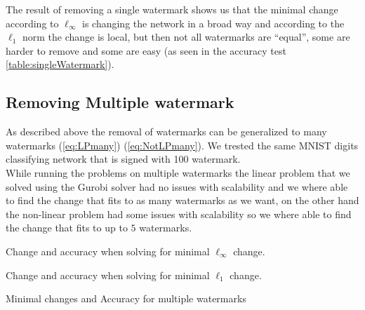 \documentclass[a4paper]{easychair}
\begin{document}
The result of removing a single watermark shows us that the minimal change according to $\ell_\infty$ is changing the network in a broad way and according to the $\ell_1$ norm the change is local, but then not all watermarks are ``equal'', some are harder to remove and some are easy (as seen in the accuracy test \ref{table:singleWatermark}).

\subsection{Removing Multiple watermark}

As described above the removal of watermarks can be generalized to many watermarks (\ref{eq:LPmany}) (\ref{eq:NotLPmany}). We trested the same MNIST digits classifying network that is signed with 100 watermark.
\\
While running the problems on multiple watermarks the linear problem that we solved using the Gurobi solver had no issues with scalability and we where able to find the change that fits to as many watermarks as we want, on the other hand the non-linear problem had some issues with scalability so we where able to find the change that fits to up to $5$ watermarks.

\begin{table}
\begin{subtable}{1\textwidth}
\centering
{}
\caption{Change and accuracy when solving for minimal $\ell_\infty$ change.}
\end{subtable}
\begin{subtable}{1\textwidth}
\centering
{}
\caption{Change and accuracy when solving for minimal $\ell_1$ change.}
\end{subtable}
\caption{Minimal changes and Accuracy for multiple watermarks}
\label{table:multipleWatermarks}
\end{table}
\end{document}
